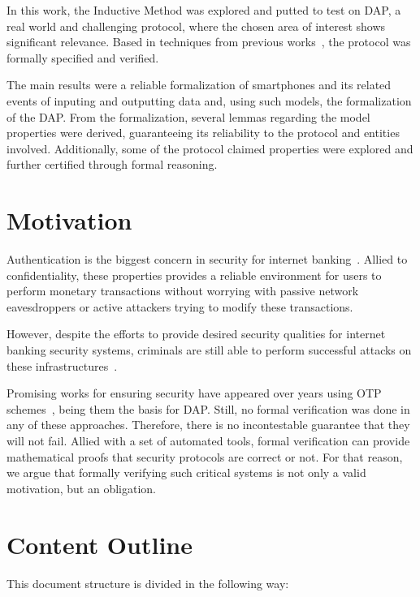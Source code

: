 In this work, the Inductive Method was explored and putted to test on DAP, a real world and challenging protocol, where the chosen area of interest shows significant relevance. Based in techniques from previous works~\cite{BellaPaulson2006, Paulson99, Paulson98}, the protocol was formally specified and verified.

The main results were a reliable formalization of smartphones and its related events of inputing and outputting data and, using such models, the formalization of the DAP. From the formalization, several lemmas regarding the model properties were derived, guaranteeing its reliability to the protocol and entities involved. Additionally, some of the protocol claimed properties were explored and further certified through formal reasoning.




\section{Motivation}
Authentication is the biggest concern in security for internet banking~\cite{Hutchinson2003}. Allied to confidentiality, these properties provides a reliable environment for users to perform monetary transactions without worrying with passive network eavesdroppers or active attackers trying to modify these transactions.

However, despite the efforts to provide desired security qualities for internet banking security systems, criminals are still able to perform successful attacks on these infrastructures~\cite{Adham2013}.

Promising works for ensuring security have appeared over years using OTP schemes~\cite{Starnberger2009, LeeHyunLim2010}, being them the basis for DAP\@. Still, no formal verification was done in any of these approaches. Therefore, there is no incontestable guarantee that they will not fail. Allied with a set of automated tools, formal verification can provide mathematical proofs that security protocols are correct or not. For that reason, we argue that formally verifying such critical systems is not only a valid motivation, but an obligation.



\section{Content Outline}

This document structure is divided in the following way:

